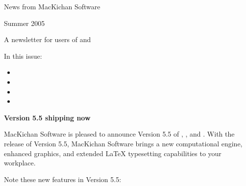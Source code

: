\documentclass{article}
\begin{document}
News from MacKichan Software

Summer 2005

A newsletter for users of and %

In this issue:

\begin{itemize}
\item 
%

\item 
%

\item 
%

\item 
%
\end{itemize}

\label{55}\textbf{Version 5.5 shipping now}

MacKichan Software is pleased to announce Version 5.5 of , , and . With the release of Version 5.5, MacKichan Software
brings a new computational engine, enhanced graphics, and extended LaTeX
typesetting capabilities to your workplace.

Note these new features in Version 5.5:
\end{document}
